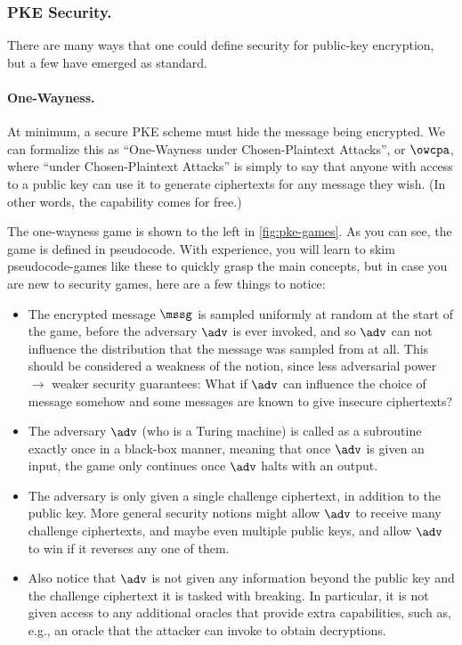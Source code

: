     \subsubsection{PKE Security.}
      There are many ways that one could define security for
        public-key encryption, but a few have emerged as standard.

      \paragraph{One-Wayness.}
        At minimum, a secure PKE scheme must hide the message being encrypted.
          We can formalize this as ``One-Wayness under Chosen-Plaintext Attacks'',
          or $\owcpa$, where ``under Chosen-Plaintext Attacks'' is simply
          to say that anyone with access to a public key can use it to generate
          ciphertexts for any message they wish.
          (In other words, the  capability comes for free.)

        The one-wayness game is shown to the left in \cref{fig:pke-games}. As
          you can see, the game is defined in pseudocode. With experience, you
          will learn to skim pseudocode-games like these to quickly
          grasp the main concepts, but in case you are new to security games,
          here are a few things to notice:
          \begin{itemize}
            \item The encrypted message $\mssg$ is sampled uniformly at random 
              at the start of the game, before the adversary $\adv$ is ever invoked,
              and so $\adv$ can not influence the distribution that the
              message was sampled from at all.
              This should be considered a weakness of the notion, since less
              adversarial power $\to$ weaker security guarantees:
              What if $\adv$ can influence the choice of message somehow and some messages are known to give insecure ciphertexts?
            \item The adversary $\adv$ (who is a Turing machine) is called as a subroutine exactly
              once in a black-box manner, meaning that once $\adv$ is given an input,
              the game only continues once $\adv$ halts with an output. 
            \item The adversary is only given a single challenge    
              ciphertext, in addition to the public key.
              More general security notions might allow $\adv$ to receive many challenge ciphertexts, and maybe even multiple public keys, and allow $\adv$ to win if it reverses any one of them.
            \item  Also notice that $\adv$ is not given any information
              beyond the public key and the challenge ciphertext it is tasked with breaking. In particular, it is not given access to any additional oracles that provide extra capabilities, such as, e.g., an oracle that the attacker can invoke to obtain decryptions.
          \end{itemize}

